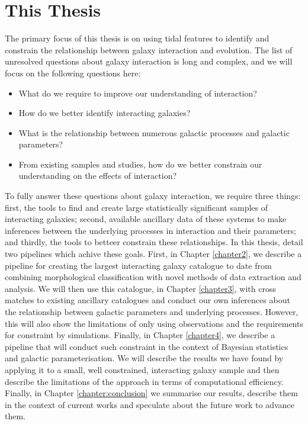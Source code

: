 \section{This Thesis}
\noindent The primary focus of this thesis is on using tidal features to identify and constrain the relationship between galaxy interaction and evolution. The list of unresolved questions about galaxy interaction is long and complex, and we will focus on the following questions here:

\begin{itemize}
	\item What do we require to improve our understanding of interaction?
	\item How do we better identify interacting galaxies?
	\item What is the relationship between numerous galactic processes and galactic parameters?
	\item From existing samples and studies, how do we better constrain our understanding on the effects of interaction?
\end{itemize}

To fully answer these questions about galaxy interaction, we require three things: first, the tools to find and create large statistically significant samples of interacting galaxies; second, available ancillary data of these systems to make inferences between the underlying processes in interaction and their parameters; and thirdly, the tools to betteer constrain these relationships. In this thesis, detail two pipelines which achive these goals. First, in Chapter \ref{chapter2}, we describe a pipeline for creating the largest interacting galaxy catalogue to date from combining morphological classification with novel methods of data extraction and analysis. We will then use this catalogue, in Chapter \ref{chapter3}, with cross matches to existing ancillary catalogues and conduct our own inferences about the relationship between galactic parameters and underlying processes. However, this will also show the limitations of only using observations and the requirements for constraint by simulations. Finally, in Chapter \ref{chapter4},  we describe a pipeline that will conduct such constraint in the context of Bayesian statistics and galactic parameterisation. We will describe the results we have found by applying it to a small, well constrained, interacting galaxy sample and then describe the limitations of the approach in terms of computational efficiency. Finally, in Chapter \ref{chapter:conclusion} we summarise our results, describe them in the context of current works and speculate about the future work to advance them.